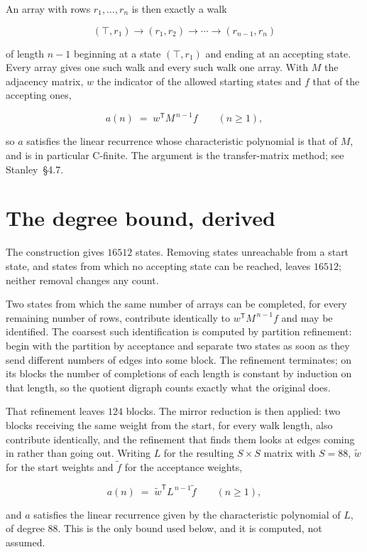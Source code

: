 \documentclass[11pt]{article}
\theoremstyle{definition}
\begin{document}
An array with rows $r_1,\dots,r_n$ is then exactly a walk

\[(\top,r_1) \to (r_1,r_2) \to \cdots \to (r_{n-1},r_n)\]

of length $n-1$ beginning at a state $(\top,r_1)$ and ending at an accepting state. Every array gives one such walk and every such walk one array. With $M$ the adjacency matrix, $w$ the indicator of the allowed starting states and $f$ that of the accepting ones,

\[a(n) \;=\; w^{\mathsf T} M^{\,n-1} f \qquad (n \ge 1),\]

so $a$ satisfies the linear recurrence whose characteristic polynomial is that of $M$, and is in particular C-finite. The argument is the transfer-matrix method; see Stanley~\S4.7.

\section{The degree bound, derived}

The construction gives $16512$ states. Removing states unreachable from a start state, and states from which no accepting state can be reached, leaves $16512$; neither removal changes any count.

Two states from which the same number of arrays can be completed, for every remaining number of rows, contribute identically to $w^{\mathsf T}M^{\,n-1}f$ and may be identified. The coarsest such identification is computed by partition refinement: begin with the partition by acceptance and separate two states as soon as they send different numbers of edges into some block. The refinement terminates; on its blocks the number of completions of each length is constant by induction on that length, so the quotient digraph counts exactly what the original does.

That refinement leaves $124$ blocks. The mirror reduction is then applied: two blocks receiving the same weight from the start, for every walk length, also contribute identically, and the refinement that finds them looks at edges coming in rather than going out. Writing $L$ for the resulting $S \times S$ matrix with $S = 88$, $\tilde w$ for the start weights and $\tilde f$ for the acceptance weights,

\[a(n) \;=\; \tilde w^{\mathsf T} L^{\,n-1} \tilde f \qquad (n \ge 1),\]

and $a$ satisfies the linear recurrence given by the characteristic polynomial of $L$, of degree $88$. This is the only bound used below, and it is computed, not assumed.
\end{document}
